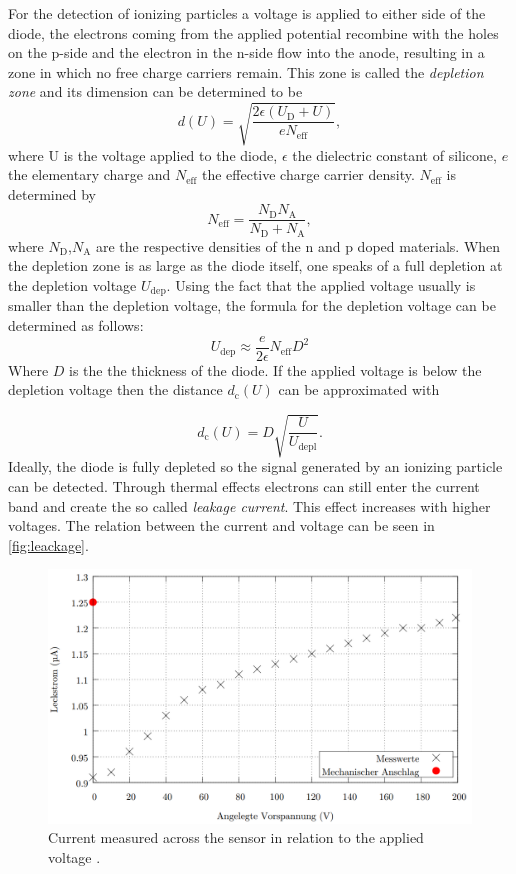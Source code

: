 For the detection of ionizing particles a voltage is applied to either side of the diode, the electrons coming from the applied potential recombine with the holes on the p-side and the electron in the n-side flow into the anode, resulting in a zone in which no free charge carriers remain. This zone is called the \textit{depletion zone} and its dimension can be determined to be
\begin{equation}
	d(U) = \sqrt{\frac{2\epsilon(U_\mathrm{D}+ U)}{eN_\mathrm{eff}}},
	\label{depl}
\end{equation}
where U is the voltage applied to the diode, $\epsilon$ the dielectric constant of silicone, $e$ the elementary charge and $N_\mathrm{eff}$ the effective charge carrier density. $N_\mathrm{eff}$ is determined by 
\begin{equation*}
	N_\mathrm{eff} = \frac{N_\mathrm{D}N_\mathrm{A}}{N_\mathrm{D}+N_\mathrm{A}},
\end{equation*}
where $N_\mathrm{D}$,$N_\mathrm{A}$ are the respective densities of the n and p doped materials. When the depletion zone is as large as the diode itself, one speaks of a full depletion at the depletion voltage $U_\mathrm{dep}$. Using the fact that the applied voltage usually is smaller than the depletion voltage, the formula for the depletion voltage can be determined as follows:
\begin{equation*}
	U_\mathrm{dep} \approx \frac{e}{2\epsilon} N_\mathrm{eff} D^2
\end{equation*}
Where $D$ is the the thickness of the diode. If the applied voltage is below the depletion voltage then the distance $d_\mathrm{c}(U)$ can be approximated with

\begin{equation*}
	d_\mathrm{c}(U)= D\sqrt{\frac{U}{U_\mathrm{depl}}}.
\end{equation*}
Ideally, the diode is fully depleted so the signal generated by an ionizing particle can be detected. Through thermal effects electrons can still enter the current band and create the so called \textit{leakage current}. This effect increases with higher voltages. The relation between the current and voltage can be seen in \autoref{fig:leackage}.

\begin{figure}[H]
	\centering
	\includegraphics[width=0.7\linewidth]{Assets/leackage}
	\caption{Current measured across the sensor in relation to the applied voltage \cite{V15}.}
	\label{fig:leackage}
\end{figure}


